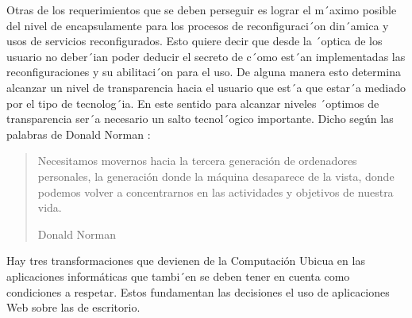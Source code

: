 Otras de los requerimientos que se deben perseguir es lograr el m´aximo posible
del nivel de encapsulamente para los procesos de reconfiguraci´on din´amica y
usos de servicios reconfigurados. Esto quiere decir que desde la ´optica de los
usuario no deber´ian poder deducir el secreto de c´omo est´an implementadas las
reconfiguraciones y su abilitaci´on para el uso. De alguna manera esto
determina alcanzar un nivel de transparencia hacia el usuario que est´a que
estar´a mediado por el tipo de tecnolog´ia. En este sentido para alcanzar
niveles ´optimos de transparencia ser´a necesario un salto tecnol´ogico
importante. Dicho según las palabras de Donald Norman \cite{cap1.196}:

\begin{quote}
Necesitamos movernos hacia la tercera generación de ordenadores
personales, la generación donde la máquina desaparece de la vista,
donde podemos volver a concentrarnos en las actividades y objetivos
de nuestra vida.
\begin{flushright} Donald Norman \end{flushright}
\end{quote} 

Hay tres transformaciones que devienen de la Computación Ubicua en las
aplicaciones informáticas que tambi´en se deben tener en cuenta como
condiciones a respetar. Estos fundamentan las decisiones el uso de
aplicaciones Web sobre las de escritorio.

